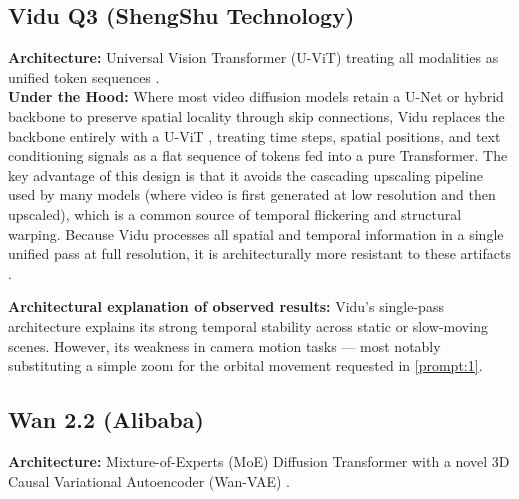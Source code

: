 \documentclass[sigconf]{acmart}
\begin{document}
\subsection{Vidu Q3 (ShengShu Technology)}
\textbf{Architecture:} Universal Vision Transformer (U-ViT) treating
all modalities as unified token sequences \cite{bao2023all,
    shengshu2024vidu}. \\

\noindent\textbf{Under the Hood:} Where most video diffusion models
retain a U-Net or hybrid backbone to preserve spatial locality through
skip connections, Vidu replaces the backbone entirely with a U-ViT
\cite{bao2023all}, treating time steps, spatial positions, and text
conditioning signals as a flat sequence of tokens fed into a pure
Transformer. The key advantage of this design is that it avoids the
cascading upscaling pipeline used by many models (where video is first
generated at low resolution and then upscaled), which is a common
source of temporal flickering and structural warping. Because Vidu
processes all spatial and temporal information in a single unified pass
at full resolution, it is architecturally more resistant to these
artifacts \cite{shengshu2024vidu}.

\noindent\textbf{Architectural explanation of observed results:} Vidu's
single-pass architecture explains its strong temporal stability across
static or slow-moving scenes. However, its weakness in camera motion
tasks — most notably substituting a simple zoom for the orbital
movement requested in \ref{prompt:1}.

\subsection{Wan 2.2 (Alibaba)}
\textbf{Architecture:} Mixture-of-Experts (MoE) Diffusion Transformer
with a novel 3D Causal Variational Autoencoder (Wan-VAE)
\cite{alibaba2025wan}. \\
\end{document}
